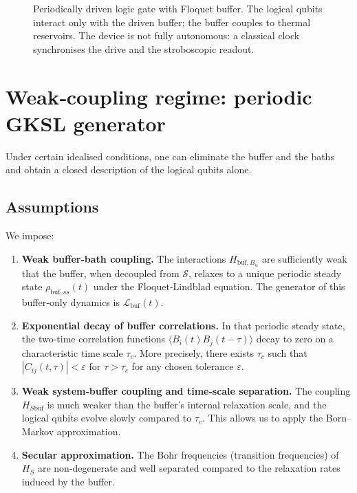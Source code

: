 \documentclass[11pt,a4paper]{article}
\theoremstyle{plain}
\theoremstyle{definition}
\theoremstyle{remark}
\newcommand{\calS}{\mathcal{S}}
\newcommand{\calB}{\mathcal{B}}
\begin{document}
\begin{figure}[h]
\centering
{}
\caption{Periodically driven logic gate with Floquet buffer. The logical qubits interact only with the driven buffer; the buffer couples to thermal reservoirs. The device is not fully autonomous: a classical clock synchronises the drive and the stroboscopic readout.}
\label{fig:schematic}
\end{figure}

\section{Weak‑coupling regime: periodic GKSL generator}\label{sec:weak}
Under certain idealised conditions, one can eliminate the buffer and the baths and obtain a closed description of the logical qubits alone.

\subsection{Assumptions}
We impose:
\begin{enumerate}[label=(A\arabic*),leftmargin=*]
    \item \textbf{Weak buffer‑bath coupling.} The interactions $H_{\text{buf},B_\alpha}$ are sufficiently weak that the buffer, when decoupled from $\calS$, relaxes to a unique periodic steady state $\rho_{\text{buf},ss}(t)$ under the Floquet‑Lindblad equation. The generator of this buffer‑only dynamics is $\mathcal{L}_{\text{buf}}(t)$.
    \item \textbf{Exponential decay of buffer correlations.} In that periodic steady state, the two‑time correlation functions $\langle B_i(t)B_j(t-\tau)\rangle$ decay to zero on a characteristic time scale $\tau_c$. More precisely, there exists $\tau_c$ such that $|C_{ij}(t,\tau)|<\varepsilon$ for $\tau>\tau_c$ for any chosen tolerance $\varepsilon$.
    \item \textbf{Weak system‑buffer coupling and time‑scale separation.} The coupling $H_{S\text{buf}}$ is much weaker than the buffer’s internal relaxation scale, and the logical qubits evolve slowly compared to $\tau_c$. This allows us to apply the Born–Markov approximation.
    \item \textbf{Secular approximation.} The Bohr frequencies (transition frequencies) of $H_S$ are non‑degenerate and well separated compared to the relaxation rates induced by the buffer.
\end{enumerate}
\end{document}
